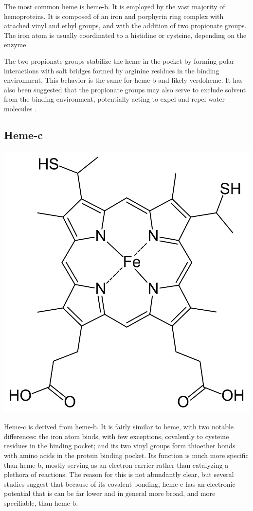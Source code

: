 \documentclass[a4paper, nobind]{templates/ociamthesis}
\let\origfigure\figure
\let\endorigfigure\endfigure
\renewenvironment{figure}[1][2] {
    \expandafter\origfigure\expandafter[H]
} {
    \endorigfigure
}
\begin{document}
The most common heme is heme-b. It is employed by the vast majority of hemoproteins. It is composed of an iron and porphyrin ring complex with attached vinyl and ethyl groups, and with the addition of two propionate groups. The iron atom is usually coordinated to a histidine or cysteine, depending on the enzyme\autocite{Poulos2014,Kleingardner2015}.

The two propionate groups stabilize the heme in the pocket by forming polar interactions with salt bridges formed by arginine residues in the binding environment\autocite{Barrows2005}. This behavior is the same for heme-b and likely verdoheme. It has also been suggested that the propionate groups may also serve to exclude solvent from the binding environment, potentially acting to expel and repel water molecules \autocite{Hayashi2009}.

\hypertarget{heme-c}{%
\subsection{Heme-c}\label{heme-c}}

\begin{figure}

{\centering \includegraphics[width=0.5\linewidth]{figures/HEC} 

}

\caption{Heme-c (HEC)}\label{fig:structHEC}
\end{figure}

Heme-c is derived from heme-b. It is fairly similar to heme, with two notable differences: the iron atom binds, with few exceptions, covalently to cysteine residues in the binding pocket; and its two vinyl groups form thioether bonds with amino acids in the protein binding pocket. Its function is much more specific than heme-b, mostly serving as an electron carrier rather than catalyzing a plethora of reactions. The reason for this is not abundantly clear, but several studies suggest that because of its covalent bonding, heme-c has an electronic potential that is can be far lower and in general more broad, and more specifiable, than heme-b. \autocite{Bowman2008,Kleingardner2015}
\end{document}
